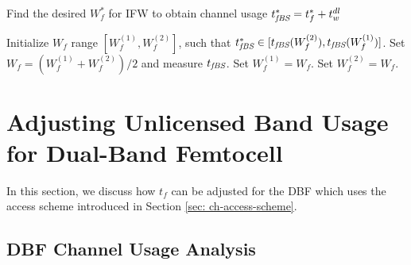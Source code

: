\documentclass[journal,final,letterpaper,10pt,doublecolumn,twoside]{IEEEtran}
\begin{document}
\begin{algorithm}\caption{Find the desired $W_f^*$ for IFW to obtain channel usage
$t^*_{\emph{fBS}}=t_f^* +t_w^{dl}$}\label{algorithm:IFW-Find-Wf}
\begin{algorithmic}[1]




\STATE Initialize $W_f$ range $[W_f^{(1)}, W_f^{(2)}]$, such that
$t^*_{\emph{fBS}} \in [t_{\emph{fBS}}(W_f^{(2)}),t_{\emph{fBS}}(W_f^{(1)})]$. \REPEAT
    \STATE Set $W_f = (W_f^{(1)} + W_f^{(2)})/2$ and measure $t_{\emph{fBS}}$.
        \STATE Set $W_f^{(1)} = W_f$.
    \ELSE
         \STATE Set $W_f^{(2)} = W_f$.
    \ENDIF
{}

\end{algorithmic}
\end{algorithm}





\section{Adjusting Unlicensed Band Usage for Dual-Band Femtocell}\label{sec_DBF}
In this section, we discuss how $t_f$ can be adjusted for the DBF which uses the access scheme introduced in Section \ref{sec: ch-access-scheme}.

\subsection{DBF Channel Usage Analysis}\label{subsection-DBF-ch-usage-analysis}
\end{document}
